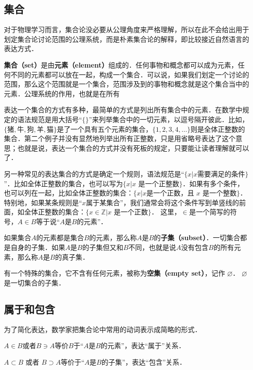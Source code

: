 \subsection{集合}

对于物理学习而言，集合论没必要从公理角度来严格理解，所以在此不会给出用于划定集合论讨论范围的公理系统，而是朴素集合论的解释，即比较接近自然语言的表达方式．

\textbf{集合（set）}是由\textbf{元素（element）}组成的．任何事物和概念都可以成为元素，任何不同的元素都可以放在一起，构成一个集合．可以说，如果我们划定一个讨论的范围，那么这个范围就是一个集合，范围涉及到的事物和概念就是这个集合当中的元素．公理系统的作用，也就是在所有 %

表达一个集合的方式有多种，最简单的方式是列出所有集合中的元素．在数学中规定的语法规范是用大括号“$\{\}$”来列举集合中的一切元素，以逗号隔开彼此．比如，$\{\text{猪}, \text{牛}, \text{狗}, \text{羊}, \text{猫}\}$是了一个具有五个元素的集合，$\{1,2,3,4,\dots\}$则是全体正整数的集合．第二个例子并没有显然地列举出所有正整数，只是用省略号表达了这个意思；也就是说，表达一个集合的方式并没有死板的规定，只要能让读者理解就可以了．

另一种常见的表达集合的方式是确定一个规则，语法规范是“$\{x|x \text{需要满足的条件}\}$”．比如全体正整数的集合，也可以写为$\{x|\text{$x$ 是一个正整数}\}$．如果有多个条件，也可以列在一起，比如全体正整数的集合：$\{x|x \text{是一个正数，且 $x$ 是一个整数}\}$．特别地，如果某条规则是“$x$属于某集合”，我们通常会将这个条件写到单竖线的前面，如全体正整数的集合：$\{x\in\mathbb{Z}|\text{$x$ 是一个正数}\}$． 这里，$\in$是一个简写的符号，$A\in B$等于说“$A$是$B$的元素”．

如果集合$A$的元素都是集合$B$的元素，那么称$A$是$B$的\textbf{子集（subset）}．一切集合都是自身的子集．如果$A$是$B$的子集但又和$B$不同，也就是说$A$没有包含$B$的所有元素，那么称$A$是$B$的真子集．

有一个特殊的集合，它不含有任何元素，被称为\textbf{空集（empty set）}，记作 $\varnothing$． $\varnothing$是一切集合的子集．

\subsection{属于和包含}
为了简化表达，数学家把集合论中常用的动词表示成简略的形式．

$A\in B$或者$B\ni A$等价$B$于“$A$是$B$的元素”，表达“属于”关系． 

$A\subset B$ 或者 $B\supset A$等价于“$A$是$B$的子集”，表达“包含”关系． 

